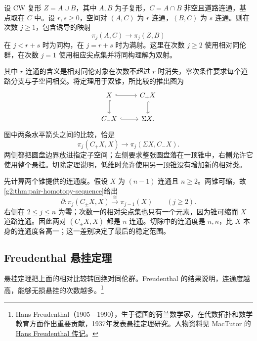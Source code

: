 \begin{theorem}[同伦切除]\label{g2:thm:homotopy-excision}
	设 CW 复形 \(Z=A\cup B\)，其中 \(A,B\) 为子复形，\(C=A\cap B\) 非空且道路连通，基点取在 \(C\) 中。设 \(r,s\ge0\)，空间对 \((A,C)\) 为 \(r\) 连通，\((B,C)\) 为 \(s\) 连通。则在次数 \(j\ge1\)，包含诱导的映射
	\[
		\pi_j(A,C)\longrightarrow\pi_j(Z,B)
	\]
	在 \(j<r+s\) 时为同构，在 \(j=r+s\) 时为满射。这里在次数 \(j\ge2\) 使用相对同伦群，在次数 \(j=1\) 使用相应尖点集并将同构理解为双射。
\end{theorem}

其中 \(r\) 连通的含义是相对同伦对象在次数不超过 \(r\) 时消失，零次条件要求每个道路分支与子空间相交。将定理用于双锥，所比较的推出图为
\[
	\begin{tikzcd}
		X \arrow[r,hook] \arrow[d,hook] & C_+X \arrow[d,hook] \\
		C_-X \arrow[r,hook] & \Sigma X.
	\end{tikzcd}
\]
图中两条水平箭头之间的比较，恰是
\[
	\pi_j(C_+X,X)\longrightarrow\pi_j(\Sigma X,C_-X).
\]
两侧都把圆盘边界放进指定子空间；左侧要求整张圆盘落在一顶锥中，右侧允许它使用整个悬挂。切除定理说明，低维时允许使用另一顶锥没有增加新的相对类。

\ProseParagraphBreak
先计算两个锥提供的连通度。假设 \(X\) 为 \((n-1)\) 连通且 \(n\ge2\)。两锥可缩，故\cref{g2:thm:pair-homotopy-sequence}给出
\[
	\partial:\pi_j(C_\pm X,X)\xrightarrow{\ \cong\ }\pi_{j-1}(X)\qquad(j\ge2).
\]
右侧在 \(2\le j\le n\) 为零；次数一的相对尖点集也只有一个元素，因为锥可缩而 \(X\) 道路连通。因此两对 \((C_\pm X,X)\) 都是 \(n\) 连通。切除中的连通度是 \(n,n\)，比 \(X\) 本身的连通度各高一；这一差别决定了最后的稳定范围。

\subsection{Freudenthal 悬挂定理}
\label{g2:subsec:0905:03}
悬挂定理把上面的相对比较转回绝对同伦群。Freudenthal 的结果说明，连通度越高，能够无损悬挂的次数越多。\footnote{Hans Freudenthal（1905—1990），生于德国的荷兰数学家，在代数拓扑和数学教育方面作出重要贡献，1937年发表悬挂定理研究。人物资料见 MacTutor 的 \href{https://mathshistory.st-andrews.ac.uk/Biographies/Freudenthal/}{Hans Freudenthal 传记}。}

